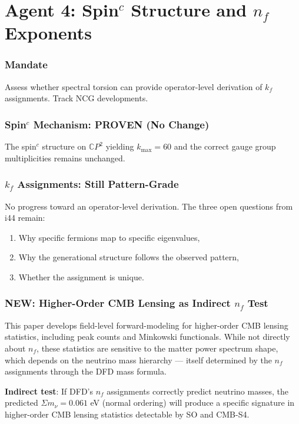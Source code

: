 \documentclass[11pt,a4paper]{article}
\newcommand{\NEW}{\textcolor{dfdblue}{\textbf{NEW}}}
\newcommand{\CP}{\mathbb{C}P}
\begin{document}
\part{Agent 4: Spin$^c$ Structure and $n_f$ Exponents}
\label{part:agent4}

\section{Mandate}

Assess whether spectral torsion can provide operator-level derivation of $k_f$ assignments. Track NCG developments.

\section{Spin$^c$ Mechanism: PROVEN (No Change)}

The spin$^c$ structure on $\CP^2$ yielding $k_{\max} = 60$ and the correct gauge group multiplicities remains unchanged.

\section{$k_f$ Assignments: Still Pattern-Grade}

No progress toward an operator-level derivation. The three open questions from i44 remain:
\begin{enumerate}
\item Why specific fermions map to specific eigenvalues,
\item Why the generational structure follows the observed pattern,
\item Whether the assignment is unique.
\end{enumerate}

\section{\NEW: Higher-Order CMB Lensing as Indirect $n_f$ Test}

\begin{tcolorbox}[colback=blue!5!white, colframe=blue!60!black,
  title={arXiv:2603.12335 (March 2026): Higher-Order CMB Lensing Statistics}]

This paper develops field-level forward-modeling for higher-order CMB lensing statistics, including peak counts and Minkowski functionals. While not directly about $n_f$, these statistics are sensitive to the matter power spectrum shape, which depends on the neutrino mass hierarchy --- itself determined by the $n_f$ assignments through the DFD mass formula.

\textbf{Indirect test}: If DFD's $n_f$ assignments correctly predict neutrino masses, the predicted $\Sigma m_\nu = 0.061$ eV (normal ordering) will produce a specific signature in higher-order CMB lensing statistics detectable by SO and CMB-S4.
\end{tcolorbox}
\end{document}

